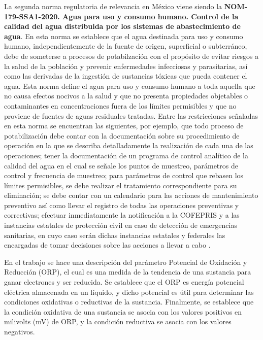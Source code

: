 La segunda norma regulatoria de relevancia en México viene siendo la \textbf{NOM-179-SSA1-2020. Agua para uso y consumo humano. Control de la calidad del agua distribuida por los sistemas de abastecimiento de agua}. En esta 
norma se establece que el agua destinada para uso y consumo humano, independientemente de la fuente de origen, superficial o subterráneo, debe de someterse a procesos de potabilzación con el propósito de evitar riesgos a 
la salud de la población y prevenir enfermedades infecciosas y parasitarias, así como las derivadas de la ingestión de sustancias tóxicas que pueda contener el agua. Esta norma define el agua para uso y consumo humano a 
toda aquella que no causa efectos nocivos a la salud y que no presenta propiedades objetables o contaminantes en concentraciones fuera de los límites permisibles y que no proviene de fuentes de aguas residuales tratadas.
Entre las restricciones señaladas en esta norma se encuentran las siguientes, por ejemplo, que todo proceso de potabilización debe contar con la documentación sobre su procedimiento de operación en la que se describa detalladamente 
la realización de cada una de las operaciones; tener la documentación de un programa de control analítico de la calidad del agua en el cual se señale los puntos de muestreo, parámetros de control y frecuencia de muestreo; 
para parámetros de control que rebasen los límites permisibles, se debe realizar el tratamiento correspondiente para su eliminación; se debe contar con un calendario para las acciones de mantenimiento preventivo así como 
llevar el registro de todas las operaciones preventivas y correctivas; efectuar inmediatamente la notificación a la COFEPRIS y a las instancias estatales de protección civil en caso de detección de emergencias sanitarias, 
en cuyo caso serán dichas instancias estatales y federales las encargadas de tomar decisiones sobre las acciones a llevar a cabo \cite{nom-179-ssa1-2020}.

En el trabajo \cite{rajib_rapid_2019} se hace una descripción del parámetro Potencial de Oxidación y Reducción (ORP), el cual es 
una medida de la tendencia de una sustancia para ganar electrones y ser reducida. Se 
establece que el ORP es energía potencial eléctrica almacenada en un líquido, y dicho potencial es útil para 
determinar las condiciones oxidativas o reductivas de la sustancia. Finalmente, se establece que la condición oxidativa 
de una sustancia se asocia con los valores positivos en milivolts (mV) de ORP, y la condición reductiva se 
asocia con los valores negativos.

